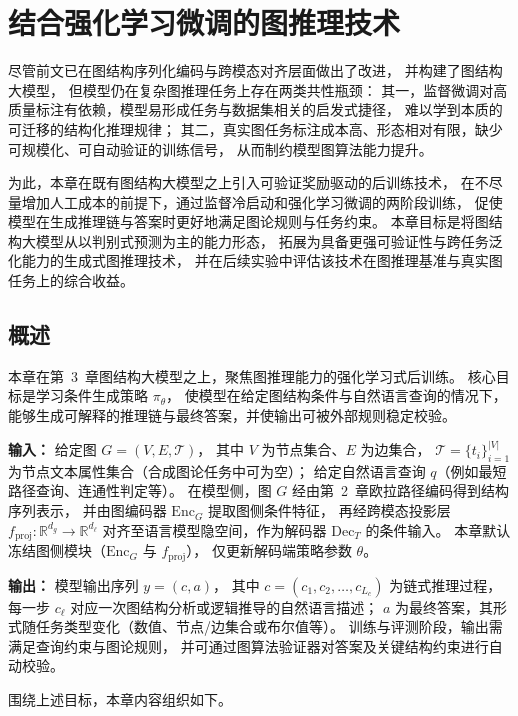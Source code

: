 
\chapter{结合强化学习微调的图推理技术}

尽管前文已在图结构序列化编码与跨模态对齐层面做出了改进，
并构建了图结构大模型，
但模型仍在复杂图推理任务上存在两类共性瓶颈：
其一，监督微调对高质量标注有依赖，模型易形成任务与数据集相关的启发式捷径，
难以学到本质的可迁移的结构化推理规律；
其二，真实图任务标注成本高、形态相对有限，缺少可规模化、可自动验证的训练信号，
从而制约模型图算法能力提升。

为此，本章在既有图结构大模型之上引入可验证奖励驱动的后训练技术，
在不尽量增加人工成本的前提下，通过监督冷启动和强化学习微调的两阶段训练，
促使模型在生成推理链与答案时更好地满足图论规则与任务约束。
本章目标是将图结构大模型从以判别式预测为主的能力形态，
拓展为具备更强可验证性与跨任务泛化能力的生成式图推理技术，
并在后续实验中评估该技术在图推理基准与真实图任务上的综合收益。


\section{概述}

本章在第~3~章图结构大模型之上，聚焦图推理能力的强化学习式后训练。
核心目标是学习条件生成策略 $\pi_\theta$，
使模型在给定图结构条件与自然语言查询的情况下，
能够生成可解释的推理链与最终答案，并使输出可被外部规则稳定校验。


\textbf{输入：}
给定图 $G=(V,E,\mathcal{T})$，
其中 $V$ 为节点集合、$E$ 为边集合，
$\mathcal{T}=\{t_i\}_{i=1}^{|V|}$ 为节点文本属性集合（合成图论任务中可为空）；
给定自然语言查询 $q$（例如最短路径查询、连通性判定等）。
在模型侧，图 $G$ 经由第~2~章欧拉路径编码得到结构序列表示，
并由图编码器 $\mathrm{Enc}_G$ 提取图侧条件特征，
再经跨模态投影层 $f_{\mathrm{proj}}:\mathbb{R}^{d_g}\!\to\!\mathbb{R}^{d_\ell}$
对齐至语言模型隐空间，作为解码器 $\mathrm{Dec}_T$ 的条件输入。
本章默认冻结图侧模块（$\mathrm{Enc}_G$ 与 $f_{\mathrm{proj}}$），
仅更新解码端策略参数 $\theta$。

\textbf{输出：}
模型输出序列 $y=(c,a)$，
其中 $c=(c_1,c_2,\dots,c_{L_c})$ 为链式推理过程，
每一步 $c_\ell$ 对应一次图结构分析或逻辑推导的自然语言描述；
$a$ 为最终答案，其形式随任务类型变化（数值、节点/边集合或布尔值等）。
训练与评测阶段，输出需满足查询约束与图论规则，
并可通过图算法验证器对答案及关键结构约束进行自动校验。

围绕上述目标，本章内容组织如下。

